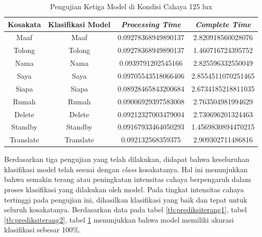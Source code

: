 \begin{longtable}{|c|c|c|c|}
  \caption{Pengujian Ketiga Model di Kondisi Cahaya 125 lux}
  \label{tb:prediksiterang3}                                   \\
  \hline
  \rowcolor[HTML]{C0C0C0}
  \textbf{Kosakata} & \textbf{Klasifikasi Model} & \textbf{\emph{Processing Time}} & \textbf{\emph{Complete Time}}\\
  \hline
  Maaf              & Maaf                        & 0.09278368949890137                           & 2.820918560028076                                  \\
  Tolong            & Tolong                        & 0.09278368949890137                           & 1.460716724395752                                  \\
  Nama              & Nama                        & 0.0939791202545166                           & 2.825596332550049                                  \\
  Saya              & Saya                        & 0.09705543518066406                           & 2.8554511070251465                                  \\
  Siapa              & Siapa                        & 0.08928465843200684                           & 2.6734185218811035                                  \\
  Rumah             & Rumah                        & 0.09006929397583008                           & 2.763504981994629                                  \\
  Delete            & Delete                        & 0.09212327003479004                           & 2.730696201324463                                  \\
  Standby           & Standby                        & 0.09167933464050293                           & 1.4569830894470215                                  \\
  Translate         & Translate                        & 0.092132568359375                           & 2.909302711486816                                  \\
  \hline
\end{longtable}

Berdasarkan tiga pengujian yang telah dilakukan, didapat bahwa keseluruhan klasifikasi model telah sesuai dengan \emph{class} kosakatanya. Hal ini menunjukkan bahwa semakin terang atau peningkatan intensitas cahaya berpengaruh dalam proses klasifikasi yang dilakukan oleh model. Pada tingkat intensitas cahaya tertinggi pada pengujian ini, dihasilkan klasifikasi yang baik dan tepat untuk seluruh kosakatanya. Berdasarkan data pada tabel \ref{tb:prediksiterang1}, tabel \ref{tb:prediksiterang2}, tabel \ref{tb:prediksiterang3} menunjukkan bahwa model memiliki akurasi klasifikasi sebesar 100\%.

